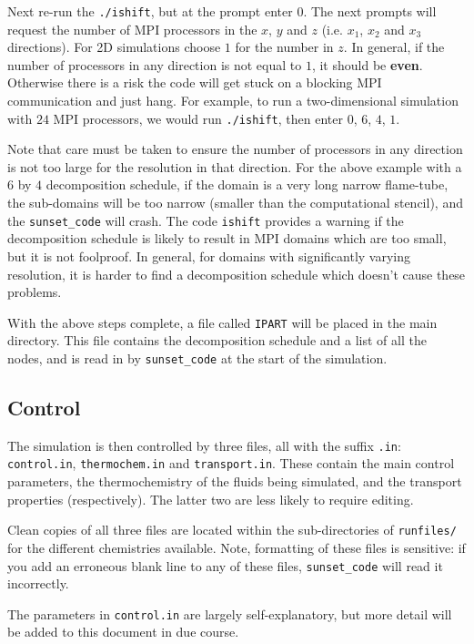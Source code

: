 \documentclass[notitlepage]{revtex4-1}
\begin{document}
Next re-run the \verb|./ishift|, but at the prompt enter $0$. The next prompts will request the number of MPI processors in the $x$, $y$ and $z$ (i.e. $x_{1}$, $x_{2}$ and $x_{3}$ directions). For 2D simulations choose $1$ for the number in $z$. In general, if the number of processors in any direction is not equal to $1$, it should be \textbf{even}. Otherwise there is a risk the code will get stuck on a blocking MPI communication and just hang. For example, to run a two-dimensional simulation with $24$ MPI processors, we would run \verb|./ishift|, then enter $0$, $6$, $4$, $1$.

Note that care must be taken to ensure the number of processors in any direction is not too large for the resolution in that direction. For the above example with a $6$ by $4$ decomposition schedule, if the domain is a very long narrow flame-tube, the sub-domains will be too narrow (smaller than the computational stencil), and the \verb|sunset_code| will crash. The code \verb|ishift| provides a warning if the decomposition schedule is likely to result in MPI domains which are too small, but it is not foolproof. In general, for domains with significantly varying resolution, it is harder to find a decomposition schedule which doesn't cause these problems.

With the above steps complete, a file called \verb|IPART| will be placed in the main directory. This file contains the decomposition schedule and a list of all the nodes, and is read in by \verb|sunset_code| at the start of the simulation.

\subsection{Control}

The simulation is then controlled by three files, all with the suffix \verb|.in|: \verb|control.in|, \verb|thermochem.in| and \verb|transport.in|. These contain the main control parameters, the thermochemistry of the fluids being simulated, and the transport properties (respectively). The latter two are less likely to require editing.

Clean copies of all three files are located within the sub-directories of \verb|runfiles/| for the different chemistries available. Note, formatting of these files is sensitive: if you add an erroneous blank line to any of these files, \verb|sunset_code| will read it incorrectly.

The parameters in \verb|control.in| are largely self-explanatory, but more detail will be added to this document in due course. 
\end{document}
